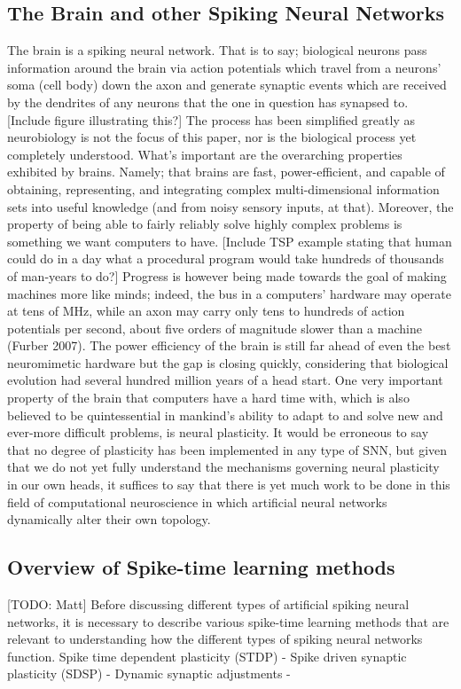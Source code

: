 \documentclass[journal]{./sty/IEEEtran}
\begin{document}
\subsection{The Brain and other Spiking Neural Networks}
The brain is a spiking neural network. That is to say; biological neurons pass information around the brain via action potentials which travel from a neurons' soma (cell body) down the axon and generate synaptic events which are received by the dendrites of any neurons that the one in question has synapsed to. 
[Include figure illustrating this?]
The process has been simplified greatly as neurobiology is not the focus of this paper, nor is the biological process yet completely understood. What's important are the overarching properties exhibited by brains. Namely; that brains are fast, power-efficient, and capable of obtaining, representing, and integrating complex multi-dimensional information sets into useful knowledge (and from noisy sensory inputs, at that). Moreover, the property of being able to fairly reliably solve highly complex problems is something we want computers to have. 
[Include TSP example stating that human could do in a day what a procedural program would take hundreds of thousands of man-years to do?]
Progress is however being made towards the goal of making machines more like minds; indeed, the bus in a computers' hardware may operate at tens of MHz, while an axon may carry only tens to hundreds of action potentials per second, about five orders of magnitude slower than a machine (Furber 2007). The power efficiency of the brain is still far ahead of even the best neuromimetic hardware but the gap is closing quickly, considering that biological evolution had several hundred million years of a head start. One very important property of the brain that computers have a hard time with, which is also believed to be quintessential in mankind's ability to adapt to and solve new and ever-more difficult problems, is neural plasticity. It would be erroneous to say that no degree of plasticity has been implemented in any type of SNN, but given that we do not yet fully understand the mechanisms governing neural plasticity in our own heads, it suffices to say that there is yet much work to be done in this field of computational neuroscience in which artificial neural networks dynamically alter their own topology.

\subsection{Overview of Spike-time learning methods}
[TODO: Matt]
Before discussing different types of artificial spiking neural networks, it is necessary to describe various spike-time learning methods that are relevant to understanding how the different types of spiking neural networks function.
Spike time dependent plasticity (STDP) - 
Spike driven synaptic plasticity (SDSP) - 
Dynamic synaptic adjustments - 
\end{document}
